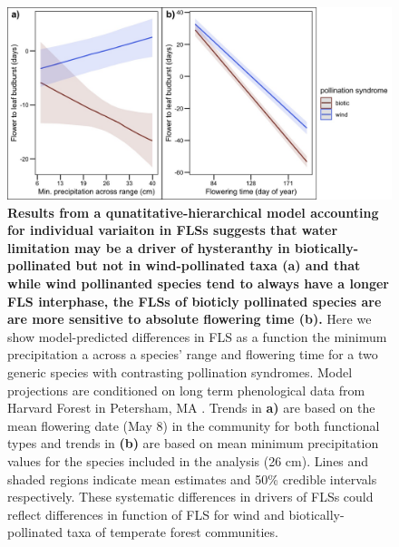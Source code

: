 \documentclass[11pt]{article}\usepackage[]{graphicx}\usepackage[]{color}
\begin{document}
 \begin{figure}[H] 
       \centering
          \includegraphics[height=0.4\textheight]{..//..//apcs.jpeg}
          \caption{\textbf{Results from a qunatitative-hierarchical model accounting for individual variaiton in FLSs suggests that water limitation may be a driver of hysteranthy in biotically-pollinated but not in wind-pollinated taxa (a)  and that while wind pollinanted species tend to always have a longer FLS interphase, the FLSs of bioticly pollinated species are are more sensitive to absolute flowering time (b).} Here we show model-predicted differences in FLS as a function the minimum precipitation a across a species' range and flowering time for a two generic species with contrasting pollination syndromes. Model projections are conditioned on long term phenological data from Harvard Forest in Petersham, MA \citep{OKeefe2015}. Trends in \textbf{a)} are based on the mean flowering date (May 8) in the community for both functional types and trends in \textbf{(b)} are based on mean minimum precipitation values for the species included in the analysis (26 cm). Lines and shaded regions indicate mean estimates and 50\% credible intervals respectively. These systematic differences in drivers of FLSs could reflect differences in function of FLS for wind and biotically-pollinated taxa of temperate forest communities.}
       \label{fig:apcs}
    \end{figure}

\pagebreak[4]
\end{document}
